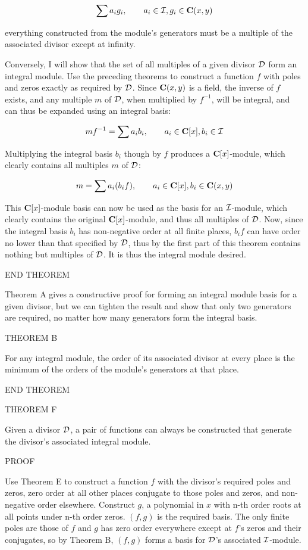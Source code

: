 	$$\sum a_i g_i, \qquad a_i \in {\cal I}, g_i \in {\bf C}(x,y)$$

everything constructed from the module's generators must be a
multiple of the associated divisor except at infinity.

Conversely, I will show that the set of all multiples of a given
divisor $\cal D$ form an integral module.  Use the preceding theorems
to construct a function $f$ with poles and zeros exactly as required
by $\cal D$.  Since ${\bf C}(x,y)$ is a field, the inverse of $f$ exists,
and any multiple $m$ of $\cal D$, when multiplied by $f^{-1}$, will be
integral, and can thus be expanded using an integral basis:

	$$mf^{-1} = \sum a_i b_i, \qquad a_i \in {\bf C}[x], b_i \in {\cal I}$$

Multiplying the integral basis $b_i$ though by $f$ produces a ${\bf
C}[x]$-module, which clearly contains all multiples $m$ of $\cal D$:

	$$m = \sum a_i (b_i f), \qquad a_i \in {\bf C}[x], b_i \in {\bf C}(x,y)$$

This ${\bf C}[x]$-module basis can now be used as the basis for an
${\cal I}$-module, which clearly contains the original ${\bf
C}[x]$-module, and thus all multiples of ${\cal D}$.  Now, since the
integral basis $b_i$ has non-negative order at all finite places, $b_i
f$ can have order no lower than that specified by ${\cal D}$, thus by
the first part of this theorem contains nothing but multiples of
${\cal D}$.  It is thus the integral module desired.

END THEOREM

Theorem A gives a constructive proof for forming an integral module
basis for a given divisor, but we can tighten the result and show that
only two generators are required, no matter how many generators form
the integral basis.

THEOREM B

For any integral module, the order of its associated divisor at every
place is the minimum of the orders of the module's generators at that
place.

END THEOREM

THEOREM F

Given a divisor ${\cal D}$, a pair of functions can always be
constructed that generate the divisor's associated integral module.

PROOF

Use Theorem E to construct a function $f$ with the divisor's required
poles and zeros, zero order at all other places conjugate to those
poles and zeros, and non-negative order elsewhere.  Construct $g$, a
polynomial in $x$ with n-th order roots at all points under n-th order
zeros.  $(f,g)$ is the required basis.  The only finite poles are
those of $f$ and $g$ has zero order everywhere except at $f$'s zeros
and their conjugates, so by Theorem B, $(f,g)$ forms a basis for
${\cal D}$'s associated ${\cal I}$-module.

